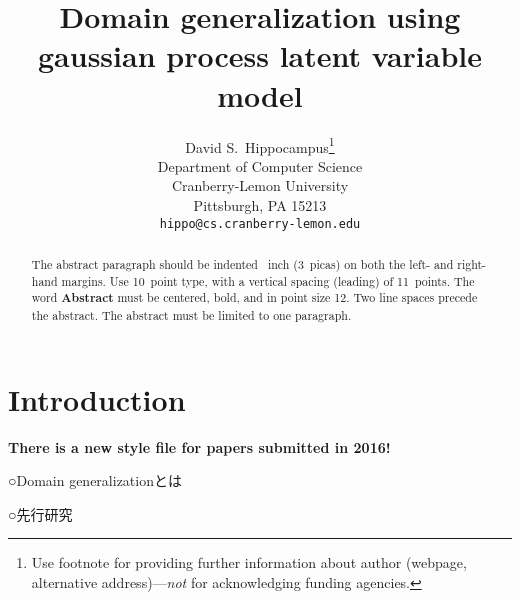 \documentclass{article}
\title{Domain generalization using gaussian process latent variable model}
\author{
  David S.~Hippocampus\thanks{Use footnote for providing further
    information about author (webpage, alternative
    address)---\emph{not} for acknowledging funding agencies.} \\
  Department of Computer Science\\
  Cranberry-Lemon University\\
  Pittsburgh, PA 15213 \\
  \texttt{hippo@cs.cranberry-lemon.edu} \\
}
\begin{document}

\maketitle

\begin{abstract}
  The abstract paragraph should be indented ~inch
  (3~picas) on both the left- and right-hand margins. Use 10~point
  type, with a vertical spacing (leading) of 11~points.  The word
  \textbf{Abstract} must be centered, bold, and in point size 12. Two
  line spaces precede the abstract. The abstract must be limited to
  one paragraph.
\end{abstract}

\section{Introduction}

\textbf{There is a new style file for papers submitted in 2016!}

○Domain generalizationとは

○先行研究




\end{document}
